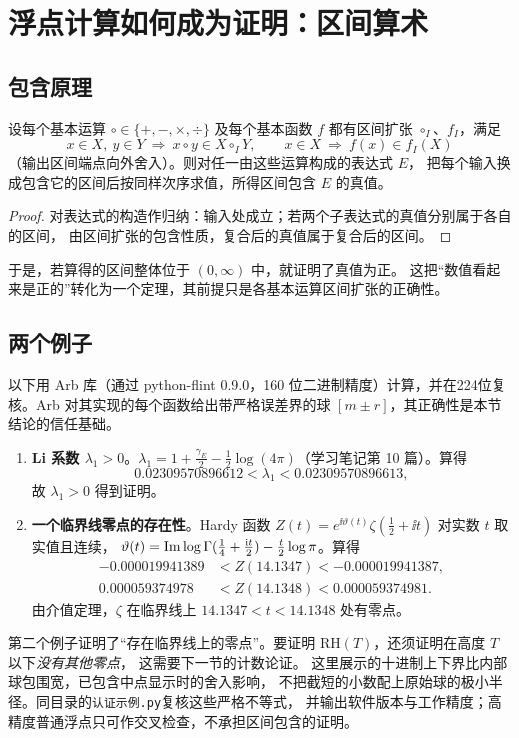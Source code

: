\documentclass[11pt]{article}
\begin{document}
\section{浮点计算如何成为证明：区间算术}
\subsection{包含原理}
\begin{proposition}\label{prop:inclusion}
设每个基本运算 $\circ\in\{+,-,\times,\div\}$ 及每个基本函数 $f$ 都有区间扩张 $\circ_I$、$f_I$，满足
\[
 x\in X,\ y\in Y\ \Longrightarrow\ x\circ y\in X\circ_IY,\qquad
 x\in X\ \Longrightarrow\ f(x)\in f_I(X)
\]
（输出区间端点向外舍入）。则对任一由这些运算构成的表达式 $E$，
把每个输入换成包含它的区间后按同样次序求值，所得区间包含 $E$ 的真值。
\end{proposition}
\begin{proof}
对表达式的构造作归纳：输入处成立；若两个子表达式的真值分别属于各自的区间，
由区间扩张的包含性质，复合后的真值属于复合后的区间。
\end{proof}
于是，若算得的区间整体位于 $(0,\infty)$ 中，就证明了真值为正。
这把“数值看起来是正的”转化为一个定理，其前提只是各基本运算区间扩张的正确性。

\subsection{两个例子}
以下用 Arb 库（通过 python-flint 0.9.0，160 位二进制精度）计算，并在224位复核。Arb 对其实现的每个函数给出带严格误差界的球
$[m\pm r]$，其正确性是本节结论的信任基础。
\begin{enumerate}
 \item \textbf{Li 系数 $\lambda_1>0$}。$\lambda_1=1+\tfrac{\gamma_E}2-\tfrac12\log(4\pi)$（学习笔记第 10 篇）。算得
 \[
  0.02309570896612<\lambda_1<0.02309570896613,
 \]
 故 $\lambda_1>0$ 得到证明。
 \item \textbf{一个临界线零点的存在性}。Hardy 函数 $Z(t)=e^{\ii\vartheta(t)}\zeta(\tfrac12+\ii t)$ 对实数 $t$ 取实值且连续，
 $\vartheta(t)=\operatorname{Im}\log\Gamma(\tfrac14+\tfrac{\mathrm i t}2)-\tfrac t2\log\pi$。算得
 \begin{align*}
  -0.000019941389&<Z(14.1347)<-0.000019941387,\\
  0.000059374978&<Z(14.1348)<0.000059374981.
 \end{align*}
 由介值定理，$\zeta$ 在临界线上 $14.1347<t<14.1348$ 处有零点。
\end{enumerate}
第二个例子证明了“存在临界线上的零点”。要证明 $\mathrm{RH}(T)$，还须证明在高度 $T$ 以下\emph{没有其他零点}，
这需要下一节的计数论证。
这里展示的十进制上下界比内部球包围宽，已包含中点显示时的舍入影响，
不把截短的小数配上原始球的极小半径。同目录的\texttt{认证示例.py}复核这些严格不等式，
并输出软件版本与工作精度；高精度普通浮点只可作交叉检查，不承担区间包含的证明。
\end{document}
